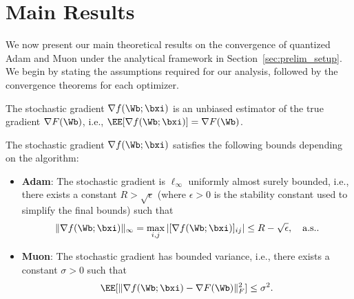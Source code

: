 \documentclass[11pt, letterpaper]{article}
\begin{document}
\begin{figure}[!t]
\vskip -0.1in
\end{figure}






\section{Main Results}\label{sec:main_results}
We now present our main theoretical results on the convergence of quantized Adam and Muon under the analytical framework in Section~\ref{sec:prelim_setup}. We begin by stating the assumptions required for our analysis, followed by the convergence theorems for each optimizer.

\begin{assumption}\label{assump:grad_unbiased}
    The stochastic gradient $\nabla f(\Wb;\bxi)$ is an unbiased estimator of the true gradient $\nabla F(\Wb)$, i.e., $\EE[\nabla f(\Wb;\bxi)] = \nabla F(\Wb)$.
\end{assumption}

\begin{assumption}\label{assump:grad_bounds}
    The stochastic gradient $\nabla f(\Wb;\bxi)$ satisfies the following bounds depending on the algorithm:
    \begin{itemize}[leftmargin=*]
        \item {\bf Adam}: The stochastic gradient is $\ell_\infty$ uniformly almost surely bounded, i.e., there exists a constant $R > \sqrt{\epsilon}$ (where $\epsilon > 0$ is the stability constant used to simplify the final bounds) such that
        \begin{align*}
            \|\nabla f(\Wb;\bxi)\|_\infty = \max_{i,j} |[\nabla f(\Wb;\bxi)]_{ij}| \le R - \sqrt{\epsilon}, \quad \text{a.s.}.
        \end{align*}
        \item {\bf Muon}: The stochastic gradient has bounded variance, i.e., there exists a constant $\sigma > 0$ such that
        \begin{align*}
            \EE[\|\nabla f(\Wb;\bxi) - \nabla F(\Wb)\|_F^2] \le \sigma^2.
        \end{align*}
    \end{itemize}
\end{assumption}
\end{document}
